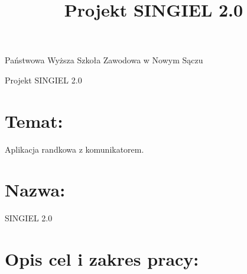 \documentclass[12pt,a4paper]{article}
\title{Projekt SINGIEL 2.0}
\begin{document}
\begin{center}
Państwowa Wyższa Szkoła Zawodowa w Nowym Sączu
\end{center}

\begin{center}
Projekt SINGIEL 2.0
\end{center}
\newpage

\section{Temat:}
Aplikacja randkowa z komunikatorem.
\section{Nazwa:}
SINGIEL 2.0
\section{Opis cel i zakres pracy:}
\end{document}
